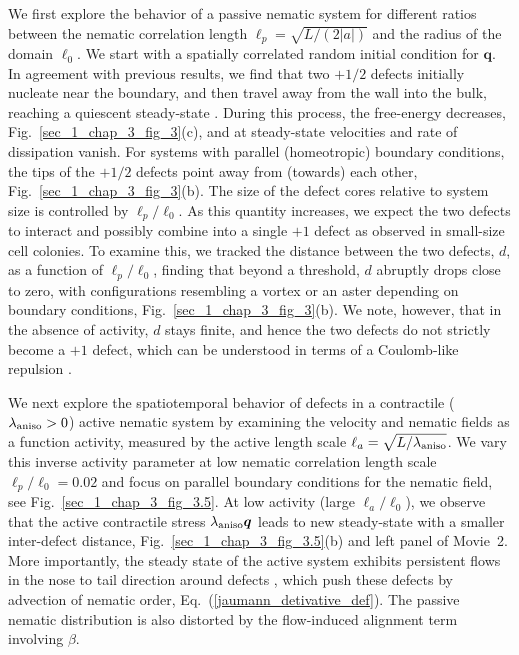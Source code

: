 \documentclass[12pt]{iopart}
\begin{document}
	We first explore the behavior of a passive nematic system for different ratios between the nematic correlation length  $\ell_p = \sqrt{L/\left(2|a|\right)}$ and the radius of the domain  $\ell_0$.  We start with a spatially correlated random initial condition for $\bm{q}$.  In agreement with previous results, we find that two $+1/2$ defects initially nucleate near the boundary, and then travel away from the wall into the bulk, reaching a quiescent steady-state \cite{hardouin2019,giomi2014}. During this process, the free-energy decreases,  Fig.~\ref{sec_1_chap_3_fig_3}(c), and at steady-state velocities and rate of dissipation vanish. For systems with parallel (homeotropic) boundary conditions, the tips of the $+1/2$ defects point away from (towards) each other, Fig.~\ref{sec_1_chap_3_fig_3}(b). The size of the defect cores relative to system size is controlled by $\ell_p/\ell_0$. As this quantity increases, we expect the two defects to interact and possibly combine into a single $+1$ defect as observed in small-size cell colonies. To examine this, we tracked the distance between the two defects, $d$, as a function of  $\ell_p/\ell_0$, finding that beyond a threshold, $d$ abruptly drops close to zero, with configurations resembling a vortex or an aster depending on boundary conditions, Fig.~\ref{sec_1_chap_3_fig_3}(b). We note, however, that in the absence of activity, $d$ stays finite, and hence the two defects do not strictly become a $+1$ defect, which can be understood in terms of a Coulomb-like repulsion \cite{thijssen2020, vafa2020}.
	
	
	We next explore the spatiotemporal behavior of defects in a contractile ($\lambda_{\rm aniso} > 0$) active nematic system by examining the  velocity and nematic fields as a function activity, measured by the active length scale $\ell_a = \sqrt{L/\lambda_{ \rm aniso}}$. We vary this inverse activity parameter at low nematic correlation length scale $\ell_p/\ell_0 = 0.02$ and focus on parallel boundary conditions for the nematic field, see Fig.~\ref{sec_1_chap_3_fig_3.5}.  At low activity (large $\ell_a/\ell_0$), we observe that the active contractile stress $\lambda_{\rm aniso} \bm{q}$ leads to new steady-state with a smaller inter-defect distance, Fig.~\ref{sec_1_chap_3_fig_3.5}(b) and left panel of Movie~2. More importantly, the steady state of the active system exhibits persistent flows in the nose to tail direction around defects \cite{doostmohammadi2018,ronning2022}, which push these defects by advection of nematic order, Eq.~(\ref{jaumann_detivative_def}). The passive nematic distribution is also distorted  by the flow-induced alignment term involving $\beta$.
	
\end{document}
